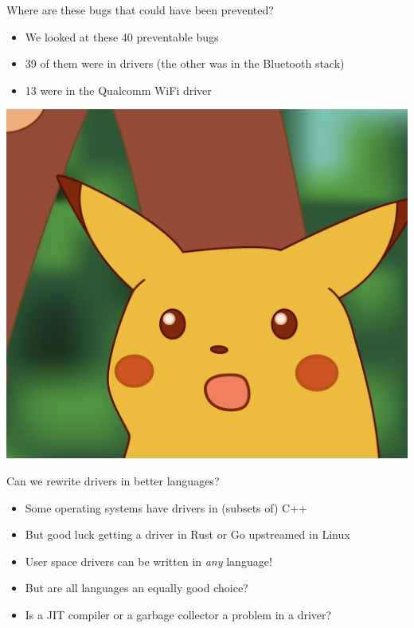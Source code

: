 \documentclass[NET,english,aspectratio=169,notitleframe]{tumbeamer}
\begin{document}
\begin{frame}{Where are these bugs that could have been prevented?}
\begin{itemize}
\item We looked at these 40 preventable bugs
\item 39 of them were in drivers (the other was in the Bluetooth stack)
\pause
\item 13 were in the Qualcomm WiFi driver
\end{itemize}
\pause
\centering\includegraphics[height=0.5\textheight]{pics/surprised_pikachu}
\end{frame}





\begin{frame}{Can we rewrite drivers in better languages?}
\begin{itemize}
\item Some operating systems have drivers in (subsets of) C++
\item But good luck getting a driver in Rust or Go upstreamed in Linux
\pause
\item User space drivers can be written in \emph{any} language!
\item But are all languages an equally good choice?
\item Is a JIT compiler or a garbage collector a problem in a driver?
\end{itemize}
\end{frame}
\end{document}
